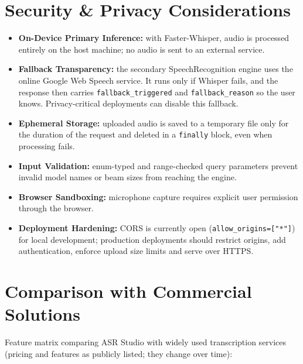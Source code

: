 \documentclass[11pt,a4paper]{article}
\begin{document}
\section{Security \& Privacy Considerations}
\begin{itemize}[leftmargin=1.2em]
  \item \textbf{On-Device Primary Inference:} with Faster-Whisper, audio is processed entirely on the host machine; no audio is sent to an external service.
  \item \textbf{Fallback Transparency:} the secondary SpeechRecognition engine uses the online Google Web Speech service. It runs only if Whisper fails, and the response then carries \texttt{fallback\_triggered} and \texttt{fallback\_reason} so the user knows. Privacy-critical deployments can disable this fallback.
  \item \textbf{Ephemeral Storage:} uploaded audio is saved to a temporary file only for the duration of the request and deleted in a \texttt{finally} block, even when processing fails.
  \item \textbf{Input Validation:} enum-typed and range-checked query parameters prevent invalid model names or beam sizes from reaching the engine.
  \item \textbf{Browser Sandboxing:} microphone capture requires explicit user permission through the browser.
  \item \textbf{Deployment Hardening:} CORS is currently open (\texttt{allow\_origins=["*"]}) for local development; production deployments should restrict origins, add authentication, enforce upload size limits and serve over HTTPS.
\end{itemize}

\section{Comparison with Commercial Solutions}
Feature matrix comparing ASR Studio with widely used transcription services (pricing and features as publicly listed; they change over time):
\end{document}
